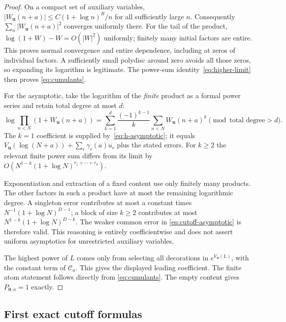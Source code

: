 \documentclass[11pt,oneside]{article}
\numberwithin{equation}{section}
\theoremstyle{definition}
\theoremstyle{remark}
\newcommand{\uu}{\mathbf u}
\newcommand{\CC}{\mathcal C}
\begin{document}
\begin{proof}
On a compact set of auxiliary variables,
$|W_{\uu}(n+a)|\le C(1+\log n)^R/n$ for all sufficiently large $n$.
Consequently $\sum_n|W_{\uu}(n+a)|^2$ converges uniformly there. For the tail
of the product, $\log(1+W)-W=O(|W|^2)$ uniformly; finitely many initial
factors are entire. This proves normal convergence and entire dependence,
including at zeros of individual factors. A sufficiently small polydisc
around zero avoids all those zeros, so expanding its logarithm is legitimate.
The power-sum identity~\eqref{eq:higher-limit} then proves
\eqref{eq:cumulants}.

For the asymptotic, take the logarithm of the \emph{finite} product as a formal
power series and retain total degree at most $d$:
\begin{equation}\label{eq:finite-log}
\log\prod_{n<N}(1+W_{\uu}(n+a))
=\sum_{k=1}^{d}\frac{(-1)^{k-1}}k
  \sum_{n<N}W_{\uu}(n+a)^k
  \pmod{\text{total degree}>d}.
\end{equation}
The $k=1$ coefficient is supplied by~\eqref{eq:h-asymptotic}; it equals
$V_{\uu}(\log(N+a))+\sum_r\gamma_r(a)u_r$ plus the stated errors. For $k\ge2$
the relevant finite power sum differs from its limit by
$O(N^{1-k}(1+\log N)^{r_1+\cdots+r_k})$.

Exponentiation and extraction of a fixed content use only finitely many
products. The other factors in such a product have at most the remaining
logarithmic degree. A singleton error contributes at most a constant times
$N^{-1}(1+\log N)^{D-1}$; a block of size $k\ge2$ contributes at most
$N^{1-k}(1+\log N)^{D-k}$. The weaker common error in
\eqref{eq:cutoff-asymptotic} is therefore valid. This reasoning is entirely
coefficientwise and does not assert uniform asymptotics for unrestricted
auxiliary variables.

The highest power of $L$ comes only from selecting all decorations in
$e^{V_{\uu}(L)}$, with the constant term of $\CC_a$. This gives the displayed
leading coefficient. The finite atom statement follows directly from
\eqref{eq:cumulants}. The empty content gives $P_{\mathbf0,a}=1$ exactly.
\end{proof}

\subsection{First exact cutoff formulas}
\end{document}
